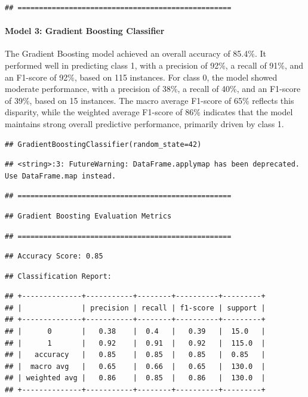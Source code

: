 \documentclass[preprint, 3p,
authoryear]{elsarticle} %
\begin{document}
\begin{verbatim}
## ==================================================
\end{verbatim}

\paragraph{Model 3: Gradient Boosting
Classifier}\label{model-3-gradient-boosting-classifier}

\hfill\break
The Gradient Boosting model achieved an overall accuracy of 85.4\%. It
performed well in predicting class 1, with a precision of 92\%, a recall
of 91\%, and an F1-score of 92\%, based on 115 instances. For class 0,
the model showed moderate performance, with a precision of 38\%, a
recall of 40\%, and an F1-score of 39\%, based on 15 instances. The
macro average F1-score of 65\% reflects this disparity, while the
weighted average F1-score of 86\% indicates that the model maintains
strong overall predictive performance, primarily driven by class 1.

\begin{verbatim}
## GradientBoostingClassifier(random_state=42)
\end{verbatim}

\begin{verbatim}
## <string>:3: FutureWarning: DataFrame.applymap has been deprecated. Use DataFrame.map instead.
\end{verbatim}

\begin{verbatim}
## ==================================================
\end{verbatim}

\begin{verbatim}
## Gradient Boosting Evaluation Metrics
\end{verbatim}

\begin{verbatim}
## ==================================================
\end{verbatim}

\begin{verbatim}
## Accuracy Score: 0.85
\end{verbatim}

\begin{verbatim}
## Classification Report:
\end{verbatim}

\begin{verbatim}
## +--------------+-----------+--------+----------+---------+
## |              | precision | recall | f1-score | support |
## +--------------+-----------+--------+----------+---------+
## |      0       |   0.38    |  0.4   |   0.39   |  15.0   |
## |      1       |   0.92    |  0.91  |   0.92   |  115.0  |
## |   accuracy   |   0.85    |  0.85  |   0.85   |  0.85   |
## |  macro avg   |   0.65    |  0.66  |   0.65   |  130.0  |
## | weighted avg |   0.86    |  0.85  |   0.86   |  130.0  |
## +--------------+-----------+--------+----------+---------+
\end{verbatim}
\end{document}
